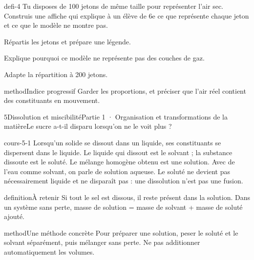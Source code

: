 \documentclass[12pt,twoside,openany]{book}
\begin{document}
\label{defi-ex-4}
\begin{pcFiche}{defi-4}
Tu disposes de 100 jetons de même taille pour représenter l’air sec. Construis une affiche qui explique à un élève de 6e ce que représente chaque jeton et ce que le modèle ne montre pas.\par
{}
\begin{questions}
\item Répartis les jetons et prépare une légende.
\item Explique pourquoi ce modèle ne représente pas des couches de gaz.
\item Adapte la répartition à 200 jetons.
\end{questions}
\begin{pcEncadre}{method}{Indice progressif}
Garder les proportions, et préciser que l’air réel contient des constituants en mouvement.\par
\end{pcEncadre}
\end{pcFiche}
\clearpage\pagestyle{otMain}
\begin{ouverture}[college1]{5}{Dissolution et miscibilité}{Partie 1 · Organisation et transformations de la matière}{Le sucre a-t-il disparu lorsqu’on ne le voit plus ?}
\end{ouverture}
\label{ch-5-cours-1}
\label{ess-5}
\begin{pcFiche}{cours-5-1}
Lorsqu’un solide se dissout dans un liquide, ses constituants se dispersent dans le liquide. Le liquide qui dissout est le solvant ; la substance dissoute est le soluté. Le mélange homogène obtenu est une solution. Avec de l’eau comme solvant, on parle de solution aqueuse. Le soluté ne devient pas nécessairement liquide et ne disparaît pas : une dissolution n’est pas une fusion.\par
{}
\begin{pcEncadre}{definition}{À retenir}
Si tout le sel est dissous, il reste présent dans la solution. Dans un système sans perte, masse de solution = masse de solvant + masse de soluté ajouté.\par
\end{pcEncadre}
\begin{pcEncadre}{method}{Une méthode concrète}
Pour préparer une solution, peser le soluté et le solvant séparément, puis mélanger sans perte. Ne pas additionner automatiquement les volumes.\par
\end{pcEncadre}
\end{pcFiche}
\end{document}

